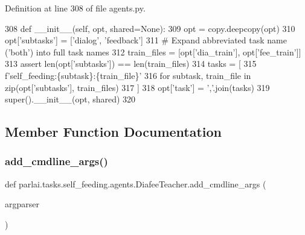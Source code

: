 Definition at line 308 of file agents.\+py.


\begin{DoxyCode}
308     \textcolor{keyword}{def }\_\_init\_\_(self, opt, shared=None):
309         opt = copy.deepcopy(opt)
310         opt[\textcolor{stringliteral}{'subtasks'}] = [\textcolor{stringliteral}{'dialog'}, \textcolor{stringliteral}{'feedback'}]
311         \textcolor{comment}{# Expand abbreviated task name ('both') into full task names}
312         train\_files = [opt[\textcolor{stringliteral}{'dia\_train'}], opt[\textcolor{stringliteral}{'fee\_train'}]]
313         \textcolor{keyword}{assert} len(opt[\textcolor{stringliteral}{'subtasks'}]) == len(train\_files)
314         tasks = [
315             f\textcolor{stringliteral}{'self\_feeding:\{subtask\}:\{train\_file\}'}
316             \textcolor{keywordflow}{for} subtask, train\_file \textcolor{keywordflow}{in} zip(opt[\textcolor{stringliteral}{'subtasks'}], train\_files)
317         ]
318         opt[\textcolor{stringliteral}{'task'}] = \textcolor{stringliteral}{','}.join(tasks)
319         super().\_\_init\_\_(opt, shared)
320 
\end{DoxyCode}


\subsection{Member Function Documentation}
\mbox{\label{classparlai_1_1tasks_1_1self__feeding_1_1agents_1_1DiafeeTeacher_aab781156a05d1046b153df4920d4ce6b}} 
\subsubsection{\texorpdfstring{add\+\_\+cmdline\+\_\+args()}{add\_cmdline\_args()}}
{\footnotesize\ttfamily def parlai.\+tasks.\+self\+\_\+feeding.\+agents.\+Diafee\+Teacher.\+add\+\_\+cmdline\+\_\+args (\begin{DoxyParamCaption}\item[{}]{argparser }\end{DoxyParamCaption})\hspace{0.3cm}{\ttfamily [static]}}



